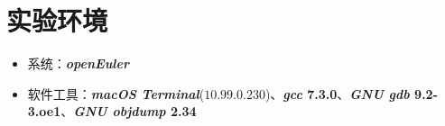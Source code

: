 \section{实验环境}
    \begin{itemize}
        \item 系统：\textbf{\textit{openEuler}} 
        \item 软件工具：\textbf{\textit{macOS Terminal}}($10.99.0.230$)、\textbf{\textit{gcc} 7.3.0}、\textbf{\textit{GNU gdb} 9.2-3.oe1}、\textbf{\textit{GNU objdump} 2.34}
    \end{itemize}